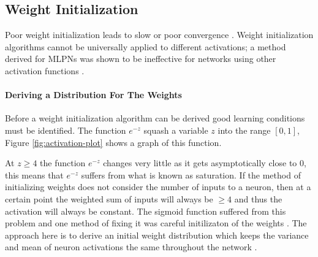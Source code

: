 \subsection{Weight Initialization} \label{subsec:weight-initlization}
Poor weight initialization leads to slow or poor convergence \cite{mishkin2015all}. Weight initialization algorithms cannot be universally applied to different activations; a method derived for MLPNs was shown to be ineffective for networks using other activation functions \cite{he2015delving}.

\paragraph{Deriving a Distribution For The Weights}
Before a weight initialization algorithm can be derived good learning conditions must be identified. The function $e^{-z}$ squash a variable $z$ into the range $[0,1]$, Figure \ref{fig:activation-plot} shows a graph of this function.\\
\noindent
\begin{minipage}[t]{0.55\textwidth}
\vspace{0px}
At $z \geq 4$ the function $e^{-z}$ changes very little as it gets asymptotically close to 0, this means that $e^{-z}$ suffers from what is known as saturation. If the method of initializing weights does not consider the number of inputs to a neuron, then at a certain point the weighted sum of inputs will always be $\geq 4$ and thus the activation will always be constant. The sigmoid function suffered from this problem and one method of fixing it was careful initilizaton of the weights \cite{glorot2010understanding}. The approach here is to derive an initial weight distribution which keeps the variance and mean of neuron activations the same throughout the network \cite{kumar2017weight}. \\
\end{minipage}
\hspace{0.05\textwidth}
